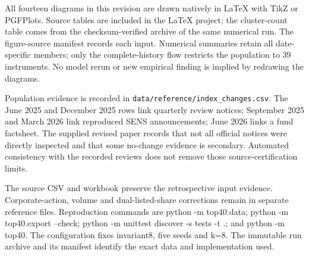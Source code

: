All fourteen diagrams in this revision are drawn natively in LaTeX with TikZ or PGFPlots. Source tables are included in the LaTeX project; the cluster-count table comes from the checksum-verified archive of the same numerical run. The figure-source manifest records each input. Numerical summaries retain all date-specific members; only the complete-history flow restricts the population to 39 instruments. No model rerun or new empirical finding is implied by redrawing the diagrams.


Population evidence is recorded in \nolinkurl{data/reference/index_changes.csv}. The June 2025 and December 2025 rows link quarterly review notices; September 2025 and March 2026 link reproduced SENS announcements; June 2026 links a fund factsheet. The supplied revised paper records that not all official notices were directly inspected and that some no-change evidence is secondary. Automated consistency with the recorded reviews does not remove those source-certification limits.


The source CSV and workbook preserve the retrospective input evidence. Corporate-action, volume and dual-listed-share corrections remain in separate reference files. Reproduction commands are python -m top40.data; python -m top40.export --check; python -m unittest discover -s tests -t .; and python -m top40. The configuration fixes invariant8, five seeds and k=8. The immutable run archive and its manifest identify the exact data and implementation used.

\FloatBarrier

